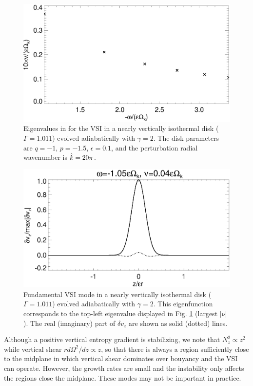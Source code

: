 \begin{figure}
  \includegraphics[width=\linewidth]{figures/eigenvalues_adia}
  \caption{Eigenvalues in for the
    VSI in a nearly vertically isothermal disk
    ($\Gamma=1.011$) evolved adiabatically with $\gamma=2$. The disk
    parameters are $q=-1$, 
    $p=-1.5$, $\epsilon=0.1$, and the perturbation radial
    wavenumber is $\hat{k}=20\pi$. \label{lowfreq_eigen_adia}
  }
\end{figure}
  

\begin{figure}
  \includegraphics[width=\linewidth]{figures/eigenvectorvz_adia}
  \caption{Fundamental VSI mode in a nearly vertically
    isothermal disk ($\Gamma=1.011$) evolved adiabatically
    with $\gamma=2$. This eigenfunction 
    corresponds to the top-left eigenvalue displayed in 
    Fig. \ref{lowfreq_eigen_adia} (largest $|\nu|$).  
    The  real (imaginary) part of $\delta v_z$ are shown as solid
    (dotted) lines. 
    \label{lowfreq_eigenfunc_adia}
  }
\end{figure}

Although a positive vertical entropy gradient is stabilizing, we note
that $N_z^2\propto z^2$  while vertical shear $rd\Omega^2/dz\propto
z$, so that there is always a region sufficiently close to the
midplane in which vertical shear dominates over bouyancy and the VSI
can operate. However, the growth rates are small and the instability
only affects the regions close the midplane. These modes may not be
important in practice.  


